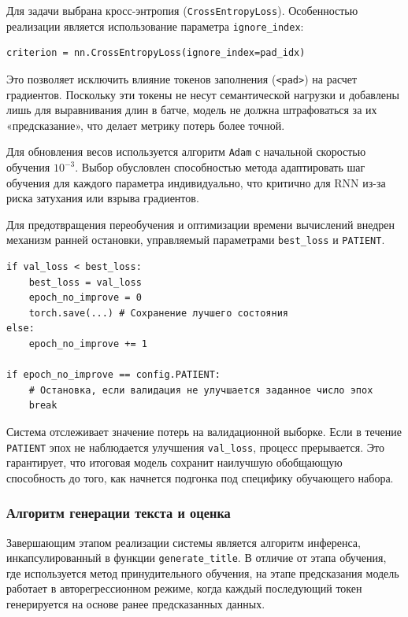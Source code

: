 \documentclass[coursework]{SCWorks}
\begin{document}
    Для задачи выбрана кросс-энтропия (\texttt{CrossEntropyLoss}). Особенностью реализации является использование параметра \texttt{ignore\_index}:

    \begin{verbatim}
criterion = nn.CrossEntropyLoss(ignore_index=pad_idx)
    \end{verbatim}

    Это позволяет исключить влияние токенов заполнения (\texttt{<pad>}) на расчет градиентов. Поскольку эти токены не несут семантической нагрузки и добавлены лишь для выравнивания длин в батче, модель не должна штрафоваться за их «предсказание», что делает метрику потерь более точной.

    Для обновления весов используется алгоритм \texttt{Adam} с начальной скоростью обучения $10^{-3}$. Выбор обусловлен способностью метода адаптировать шаг обучения для каждого параметра индивидуально, что критично для RNN из-за риска затухания или взрыва градиентов.

    Для предотвращения переобучения и оптимизации времени вычислений внедрен механизм ранней остановки, управляемый параметрами \texttt{best\_loss} и \texttt{PATIENT}.

    \begin{verbatim}
if val_loss < best_loss:
    best_loss = val_loss
    epoch_no_improve = 0
    torch.save(...) # Сохранение лучшего состояния
else:
    epoch_no_improve += 1

if epoch_no_improve == config.PATIENT:
    # Остановка, если валидация не улучшается заданное число эпох
    break
    \end{verbatim}

    Система отслеживает значение потерь на валидационной выборке. Если в течение \texttt{PATIENT} эпох не наблюдается улучшения \texttt{val\_loss}, процесс прерывается. Это гарантирует, что итоговая модель сохранит наилучшую обобщающую способность до того, как начнется подгонка под специфику обучающего набора.

    \subsubsection{Алгоритм генерации текста и оценка}

    Завершающим этапом реализации системы является алгоритм инференса,
    инкапсулированный в функции \texttt{generate\_title}.
    В отличие от этапа обучения, где используется метод принудительного обучения, на этапе предсказания модель
    работает в авторегрессионном режиме,
    когда каждый последующий токен генерируется на основе ранее предсказанных данных.
\end{document}
